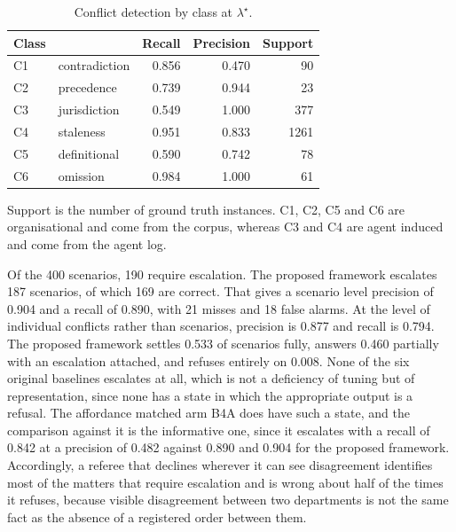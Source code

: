 \documentclass[journal]{IEEEtran}
\begin{document}
\begin{table}[!t]
\centering
\caption{Conflict detection by class at $\lambda^\star$.}
\label{tab:detection}
\footnotesize
\begin{tabular}{@{}llrrr@{}}
\toprule
Class & & Recall & Precision & Support \\
\midrule
C1 & contradiction & 0.856 & 0.470 & 90 \\
C2 & precedence    & 0.739 & 0.944 & 23 \\
C3 & jurisdiction  & 0.549 & 1.000 & 377 \\
C4 & staleness     & 0.951 & 0.833 & 1261 \\
C5 & definitional  & 0.590 & 0.742 & 78 \\
C6 & omission      & 0.984 & 1.000 & 61 \\
\bottomrule
\end{tabular}

\vspace{2pt}
\footnotesize\raggedright
Support is the number of ground truth instances. C1, C2, C5 and C6 are organisational and come from the corpus, whereas C3 and C4 are agent induced and come from the agent log.
\end{table}

Of the 400 scenarios, 190 require escalation. The proposed framework escalates 187 scenarios, of which 169 are correct. That gives a scenario level precision of 0.904 and a recall of 0.890, with 21 misses and 18 false alarms. At the level of individual conflicts rather than scenarios, precision is 0.877 and recall is 0.794. The proposed framework settles 0.533 of scenarios fully, answers 0.460 partially with an escalation attached, and refuses entirely on 0.008. None of the six original baselines escalates at all, which is not a deficiency of tuning but of representation, since none has a state in which the appropriate output is a refusal. The affordance matched arm B4A does have such a state, and the comparison against it is the informative one, since it escalates with a recall of 0.842 at a precision of 0.482 against 0.890 and 0.904 for the proposed framework. Accordingly, a referee that declines wherever it can see disagreement identifies most of the matters that require escalation and is wrong about half of the times it refuses, because visible disagreement between two departments is not the same fact as the absence of a registered order between them.
\end{document}
